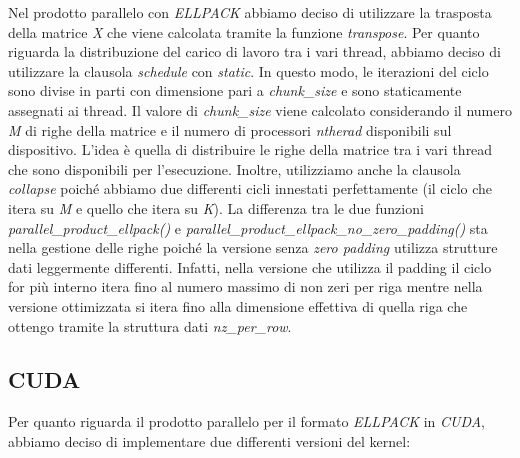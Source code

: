\documentclass{article}
\begin{document}
Nel prodotto parallelo con \textit{ELLPACK} abbiamo deciso di utilizzare la trasposta della matrice \textit{X} che viene calcolata tramite la funzione \textit{transpose}. Per quanto riguarda la distribuzione del carico di lavoro tra i vari thread, abbiamo deciso di utilizzare la clausola \textit{schedule} con \textit{static}. In questo modo, le iterazioni del ciclo sono divise in parti con dimensione pari a \textit{chunk\_size} e sono staticamente assegnati ai thread. Il valore di \textit{chunk\_size} viene calcolato considerando il numero \textit{M} di righe della matrice e il numero di processori \textit{ntherad} disponibili sul dispositivo. L'idea è quella di distribuire le righe della matrice tra i vari thread che sono disponibili per l'esecuzione. Inoltre, utilizziamo anche la clausola \textit{collapse} poiché abbiamo due differenti cicli innestati perfettamente (il ciclo che itera su \textit{M} e quello che itera su \textit{K}). La differenza tra le due funzioni \textit{parallel\_product\_ellpack()} e \textit{parallel\_product\_ellpack\_no\_zero\_padding()} sta nella gestione delle righe poiché la versione senza \textit{zero padding} utilizza strutture dati leggermente differenti. Infatti, nella versione che utilizza il padding il ciclo for più interno itera fino al numero massimo di non zeri per riga mentre nella versione ottimizzata si itera fino alla dimensione effettiva di quella riga che ottengo tramite la struttura dati \textit{nz\_per\_row}.

\subsection{CUDA}
Per quanto riguarda il prodotto parallelo per il formato \textit{ELLPACK} in \textit{CUDA}, abbiamo deciso di implementare due differenti versioni del kernel:
\end{document}
